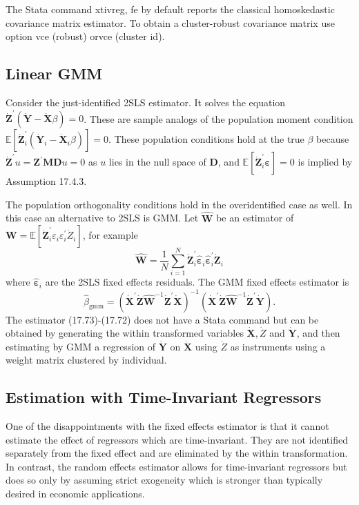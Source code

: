 \documentclass[10pt]{article}
\begin{document}
The Stata command xtivreg, fe by default reports the classical homoskedastic covariance matrix estimator. To obtain a cluster-robust covariance matrix use option vce (robust) orvce (cluster id).

\subsection{Linear GMM}
Consider the just-identified 2SLS estimator. It solves the equation $\dot{\boldsymbol{Z}}^{\prime}(\dot{\boldsymbol{Y}}-\dot{\boldsymbol{X}} \beta)=0$. These are sample analogs of the population moment condition $\mathbb{E}\left[\dot{\boldsymbol{Z}}_{i}^{\prime}\left(\dot{\boldsymbol{Y}}_{i}-\dot{\boldsymbol{X}}_{i} \beta\right)\right]=0$. These population conditions hold at the true $\beta$ because $\dot{\boldsymbol{Z}}^{\prime} u=\boldsymbol{Z}^{\prime} \boldsymbol{M D} u=0$ as $u$ lies in the null space of $\boldsymbol{D}$, and $\mathbb{E}\left[\dot{\boldsymbol{Z}}_{i}^{\prime} \boldsymbol{\varepsilon}\right]=0$ is implied by Assumption 17.4.3.

The population orthogonality conditions hold in the overidentified case as well. In this case an alternative to 2SLS is GMM. Let $\widehat{\boldsymbol{W}}$ be an estimator of $\boldsymbol{W}=\mathbb{E}\left[\dot{\boldsymbol{Z}}_{i}^{\prime} \varepsilon_{i} \varepsilon_{i}^{\prime} \dot{Z}_{i}\right]$, for example
$$
\widehat{\boldsymbol{W}}=\frac{1}{N} \sum_{i=1}^{N} \dot{\boldsymbol{Z}}_{i}^{\prime} \widehat{\boldsymbol{\varepsilon}}_{i} \widehat{\boldsymbol{\varepsilon}}_{i}^{\prime} \dot{\boldsymbol{Z}}_{i}
$$
where $\widehat{\boldsymbol{\varepsilon}}_{i}$ are the 2SLS fixed effects residuals. The GMM fixed effects estimator is
$$
\widehat{\beta}_{\mathrm{gmm}}=\left(\dot{\boldsymbol{X}}^{\prime} \dot{\boldsymbol{Z}} \widehat{\boldsymbol{W}}^{-1} \dot{\boldsymbol{Z}}^{\prime} \dot{\boldsymbol{X}}\right)^{-1}\left(\dot{\boldsymbol{X}}^{\prime} \dot{\boldsymbol{Z}} \widehat{\boldsymbol{W}}^{-1} \dot{\boldsymbol{Z}}^{\prime} \dot{\boldsymbol{Y}}\right) .
$$
The estimator (17.73)-(17.72) does not have a Stata command but can be obtained by generating the within transformed variables $\dot{\boldsymbol{X}}, \dot{Z}$ and $\dot{\boldsymbol{Y}}$, and then estimating by GMM a regression of $\dot{\boldsymbol{Y}}$ on $\dot{\boldsymbol{X}}$ using $\dot{Z}$ as instruments using a weight matrix clustered by individual.

\subsection{Estimation with Time-Invariant Regressors}
One of the disappointments with the fixed effects estimator is that it cannot estimate the effect of regressors which are time-invariant. They are not identified separately from the fixed effect and are eliminated by the within transformation. In contrast, the random effects estimator allows for time-invariant regressors but does so only by assuming strict exogeneity which is stronger than typically desired in economic applications.
\end{document}
